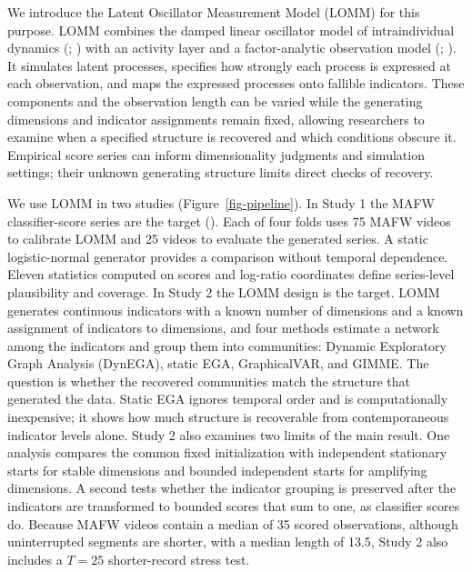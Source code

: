 \documentclass[
]{article}
\begin{document}
We introduce the Latent Oscillator Measurement Model (LOMM) for this
purpose. LOMM combines the damped linear oscillator model of
intraindividual dynamics (;
) with an
activity layer and a factor-analytic observation model
(;
). It simulates
latent processes, specifies how strongly each process is expressed at
each observation, and maps the expressed processes onto fallible
indicators. These components and the observation length can be varied
while the generating dimensions and indicator assignments remain fixed,
allowing researchers to examine when a specified structure is recovered
and which conditions obscure it. Empirical score series can inform
dimensionality judgments and simulation settings; their unknown
generating structure limits direct checks of recovery.

We use LOMM in two studies (Figure~\ref{fig-pipeline}). In Study 1 the
MAFW classifier-score series are the target
(). Each of four folds
uses 75 MAFW videos to calibrate LOMM and 25 videos to evaluate the
generated series. A static logistic-normal generator provides a
comparison without temporal dependence. Eleven statistics computed on
scores and log-ratio coordinates define series-level plausibility and
coverage. In Study 2 the LOMM design is the target. LOMM generates
continuous indicators with a known number of dimensions and a known
assignment of indicators to dimensions, and four methods estimate a
network among the indicators and group them into communities: Dynamic
Exploratory Graph Analysis (DynEGA), static EGA, GraphicalVAR, and
GIMME. The question is whether the recovered communities match the
structure that generated the data. Static EGA ignores temporal order and
is computationally inexpensive; it shows how much structure is
recoverable from contemporaneous indicator levels alone. Study 2 also
examines two limits of the main result. One analysis compares the common
fixed initialization with independent stationary starts for stable
dimensions and bounded independent starts for amplifying dimensions. A
second tests whether the indicator grouping is preserved after the
indicators are transformed to bounded scores that sum to one, as
classifier scores do. Because MAFW videos contain a median of 35 scored
observations, although uninterrupted segments are shorter, with a median
length of 13.5, Study 2 also includes a \(T=25\) shorter-record stress
test.
\end{document}
